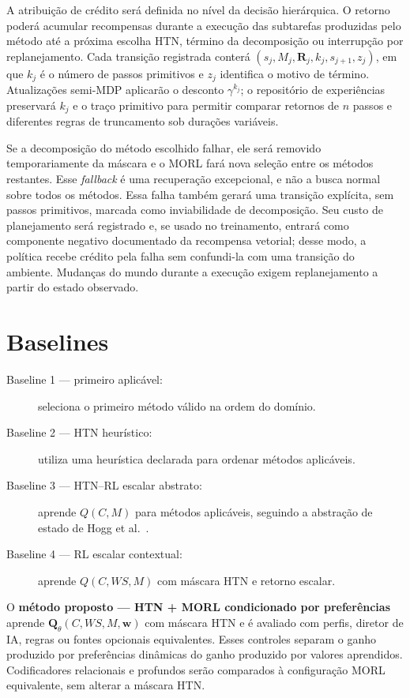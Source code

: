 A atribuição de crédito será definida no nível da decisão hierárquica.
O retorno poderá acumular recompensas durante a execução das subtarefas produzidas
pelo método até a próxima escolha HTN, término da decomposição ou interrupção por
replanejamento.
Cada transição registrada conterá $(s_j,M_j,\mathbf{R}_j,k_j,s_{j+1},z_j)$,
em que $k_j$ é o número de passos primitivos e $z_j$ identifica o motivo de
término. Atualizações semi-MDP aplicarão o desconto $\gamma^{k_j}$; o
repositório de experiências preservará $k_j$ e o traço primitivo para permitir
comparar retornos de $n$ passos e diferentes regras de truncamento sob durações
variáveis.

Se a decomposição do método escolhido falhar, ele será removido temporariamente
da máscara e o MORL fará nova seleção entre os métodos restantes. Esse
\emph{fallback} é uma recuperação excepcional, e não a busca normal sobre todos
os métodos. Essa falha também gerará uma transição explícita, sem passos
primitivos, marcada como inviabilidade de decomposição. Seu custo de planejamento
será registrado e, se usado no treinamento, entrará como componente negativo
documentado da recompensa vetorial; desse modo, a política recebe crédito pela
falha sem confundi-la com uma transição do ambiente.
Mudanças do mundo durante a execução exigem replanejamento a partir do estado
observado.



\section{Baselines}

\begin{description}
\item[Baseline 1 --- primeiro aplicável:] seleciona o primeiro método válido na ordem do domínio.
\item[Baseline 2 --- HTN heurístico:] utiliza uma heurística declarada para ordenar métodos aplicáveis.
\item[Baseline 3 --- HTN--RL escalar abstrato:] aprende $Q(C,M)$ para métodos aplicáveis, seguindo a abstração de estado de Hogg et al.\ \cite{hogg2010}.
\item[Baseline 4 --- RL escalar contextual:] aprende $Q(C,WS,M)$ com máscara HTN e retorno escalar.
\end{description}

O \textbf{método proposto --- HTN + MORL condicionado por preferências} aprende
$\mathbf{Q}_{\theta}(C,WS,M,\mathbf{w})$ com máscara HTN e é avaliado com
perfis, diretor de IA, regras ou fontes opcionais equivalentes.
Esses controles separam o ganho produzido por preferências dinâmicas do ganho
produzido por valores aprendidos.
Codificadores relacionais e profundos serão comparados à configuração MORL equivalente,
sem alterar a máscara HTN.

